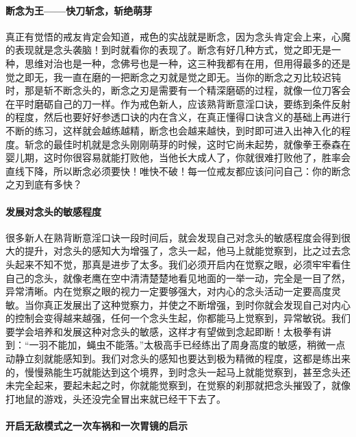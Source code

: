 \paragraph{断念为王——快刀斩念，斩绝萌芽}

真正有觉悟的戒友肯定会知道，戒色的实战就是断念，因为念头肯定会上来，心魔的表现就是念头袭脑！到时就看你的表现了。断念有好几种方式，觉之即无是一种，思维对治也是一种，念佛号也是一种，这三种我都有在用，但用得最多的还是觉之即无，我一直在磨的一把断念之刃就是觉之即无。当你的断念之刃比较迟钝时，那是斩不断念头的，断念之刃是需要有一个精深磨砺的过程，就像一位刀客会在平时磨砺自己的刀一样。作为戒色新人，应该熟背断意淫口诀，要练到条件反射的程度，然后也要好好参透口诀的内在含义，在真正懂得口诀含义的基础上再进行不断的练习，这样就会越练越精，断念也会越来越快，到时即可进入出神入化的程度。斩念的最佳时机就是念头刚刚萌芽的时候，这时它尚未起势，就像拳王泰森在婴儿期，这时你很容易就能打败他，当他长大成人了，你就很难打败他了，胜率会直线下降，所以断念必须要快！唯快不破！每一位戒友都应该问问自己：你的断念之刃到底有多快？

\paragraph{发展对念头的敏感程度}

很多新人在熟背断意淫口诀一段时间后，就会发现自己对念头的敏感程度会得到很大的提升，对念头的感知大为增强了，念头一起，他马上就能觉察到，比之过去念头起来不知不觉，那真是进步了太多。我们必须开启内在觉察之眼，必须牢牢看住自己的念头，就像老鹰在空中清清楚楚地看见地面的一举一动，完全是一目了然，异常清晰。内在觉察之眼的视力一定要够强大，对内心的念头活动一定要高度灵敏。当你真正发展出了这种觉察力，并使之不断增强，到时你就会发现自己对内心的控制会变得越来越强，任何一个念头生起，你都能马上觉察到，异常敏锐。我们要学会培养和发展这种对念头的敏感，这样才有望做到念起即断！太极拳有讲到：“一羽不能加，蝇虫不能落。”太极高手已经练出了周身高度的敏感，稍微一点动静立刻就能感知到。我们对念头的感知也要达到极为精微的程度，这都是练出来的，慢慢熟能生巧就能达到这个境界，到时念头一起马上就能觉察到，甚至念头还未完全起来，要起未起之时，你就能觉察到，在觉察的刹那就把念头摧毁了，就像打地鼠的游戏，头还没完全冒出来就已经干下去了。

\paragraph{开启无敌模式之一次车祸和一次胃镜的启示}

